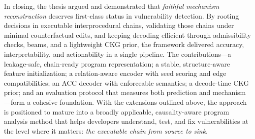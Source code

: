 \documentclass{buthesis}
\begin{document}
In closing, the thesis argued and demonstrated that \emph{faithful mechanism reconstruction} deserves first-class status in vulnerability detection. By rooting decisions in executable interprocedural chains, validating those chains under minimal counterfactual edits, and keeping decoding efficient through admissibility checks, beams, and a lightweight CKG prior, the framework delivered accuracy, interpretability, and actionability in a single pipeline. The contributions—a leakage-safe, chain-ready program representation; a stable, structure-aware feature initialization; a relation-aware encoder with seed scoring and edge compatibilities; an ACC decoder with enforceable semantics; a decode-time CKG prior; and an evaluation protocol that measures both prediction and mechanism—form a cohesive foundation. With the extensions outlined above, the approach is positioned to mature into a broadly applicable, causality-aware program analysis method that helps developers understand, test, and fix vulnerabilities at the level where it matters: \emph{the executable chain from source to sink}.


\nocite{*}


\end{document}

